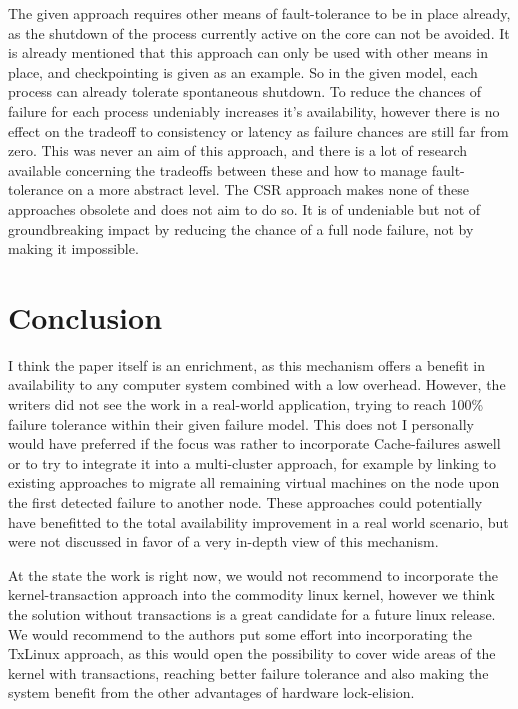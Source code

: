 \documentclass[a4paper,10pt,twoside]{article}
\begin{document}
The given approach requires other means of fault-tolerance to be in place already, as the shutdown of the process currently active on the core can not be avoided. It is already mentioned that this approach can only be used with other means in place, and checkpointing is given as an example. So in the given model, each process can already tolerate spontaneous shutdown. To reduce the chances of failure for each process undeniably increases it's availability, however there is no effect on the tradeoff to consistency or latency as failure chances are still far from zero. This was never an aim of this approach, and there is a lot of research available concerning the tradeoffs between these and how to manage fault-tolerance on a more abstract level. The CSR approach makes none of these approaches obsolete and does not aim to do so. It is of undeniable but not of groundbreaking impact by reducing the chance of a full node failure, not by making it impossible.

\section{Conclusion}

I think the paper itself is an enrichment, as this mechanism offers a benefit in availability to any computer system combined with a low overhead. However, the writers did not see the work in a real-world application, trying to reach 100\% failure tolerance within their given failure model. This does not I personally would have preferred if the focus was rather to incorporate Cache-failures aswell or to try to integrate it into a multi-cluster approach, for example by linking to existing approaches to migrate all remaining virtual machines on the node upon the first detected failure to another node. These approaches could potentially have benefitted to the total availability improvement in a real world scenario, but were not discussed in favor of a very in-depth view of this mechanism.

At the state the work is right now, we would not recommend to incorporate the kernel-transaction approach into the commodity linux kernel, however we think the solution without transactions is a great candidate for a future linux release. We would recommend to the authors put some effort into incorporating the TxLinux approach, as this would open the possibility to cover wide areas of the kernel with transactions, reaching better failure tolerance and also making the system benefit from the other advantages of hardware lock-elision. 


 
\end{document}
